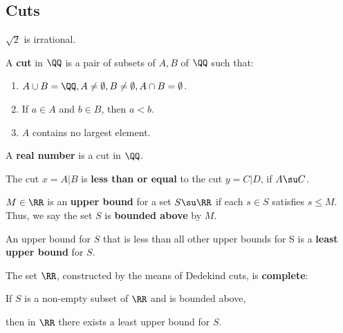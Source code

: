 \documentclass[11pt]{scrartcl}
\begin{document}
\subsection{Cuts}
\label{sec:org8a10d3a}
\begin{theorem}
\(\sqrt 2\) is irrational.
\end{theorem}
\begin{definition}
  A \textbf{cut} in $\QQ$ is a pair of subsets of $A, B$ of $\QQ$ such
  that:
  \begin{enumerate}[label=(\alph*)]
  \item
    $A\cup B = \QQ, A \neq \emptyset, B \neq \emptyset, A\cap B =
    \emptyset$.
  \item If $a\in A$ and $b\in B$, then $a<b$.
  \item $A$ contains no largest element.
  \end{enumerate}
\end{definition}
\begin{definition}
  A \textbf{real number} is a cut in $\QQ$.
\end{definition}

\begin{definition}
  The cut $x=A\vert B$ is \textbf{less than or equal} to the cut
  $y=C\vert D$, if $A\su C$.
\end{definition}
\begin{definition}
  $M\in \RR$ is an \textbf{upper bound} for a set $S\su \RR$ if each
  $s\in S$ satisfies $s\leq M$. Thus, we say the set $S$ is
  \textbf{bounded above} by $M$.\vv

  An upper bound for $S$ that is less than all other upper bounds for
  S is a \textbf{least upper bound} for $S$.
\end{definition}
\begin{theorem}
  The set $\RR$, constructed by the means of Dedekind cuts, is \textbf{complete}:

  \begin{center}
    If $S$ is a non-empty subset of $\RR$ and is bounded above,

    then in $\RR$ there exists a least upper bound for $S$.
  \end{center}
\end{theorem}
\end{document}
